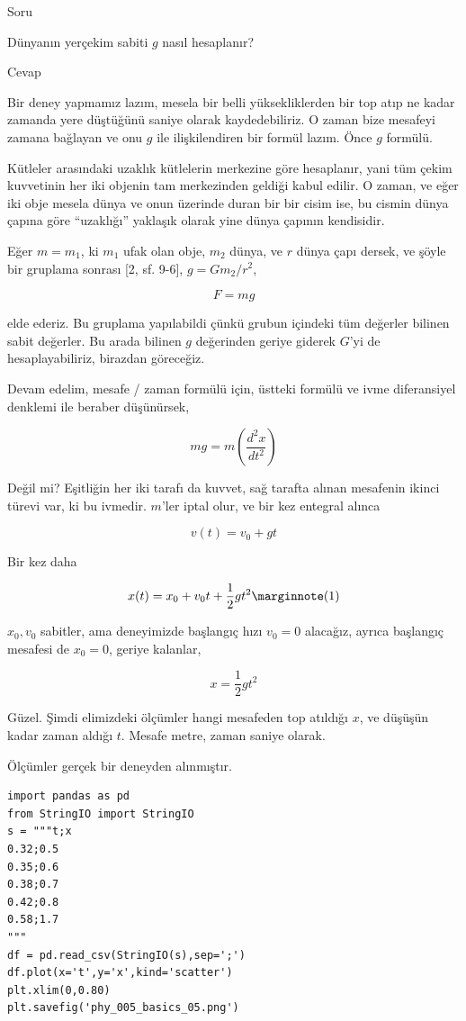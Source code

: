 \documentclass[12pt,fleqn]{article}\usepackage{../../common}
\begin{document}
Soru

Dünyanın yerçekim sabiti $g$ nasıl hesaplanır? 

Cevap

Bir deney yapmamız lazım, mesela bir belli yüksekliklerden bir top atıp ne
kadar zamanda yere düştüğünü saniye olarak kaydedebiliriz. O zaman bize
mesafeyi zamana bağlayan ve onu $g$ ile ilişkilendiren bir formül
lazım. Önce $g$ formülü.

Kütleler arasındaki uzaklık kütlelerin merkezine göre hesaplanır, yani tüm
çekim kuvvetinin her iki objenin tam merkezinden geldiği kabul edilir. O
zaman, ve eğer iki obje mesela dünya ve onun üzerinde duran bir bir cisim
ise, bu cismin dünya çapına göre ``uzaklığı'' yaklaşık olarak yine dünya
çapının kendisidir.

Eğer $m = m_1$, ki $m_1$ ufak olan obje, $m_2$ dünya, ve $r$ dünya çapı
dersek, ve şöyle bir gruplama sonrası [2, sf. 9-6], $g = Gm_2 / r^2$,

$$ F = m g$$

elde ederiz. Bu gruplama yapılabildi çünkü grubun içindeki tüm değerler bilinen
sabit değerler. Bu arada bilinen $g$ değerinden geriye giderek $G$'yi de
hesaplayabiliriz, birazdan göreceğiz.

Devam edelim, mesafe / zaman formülü için, üstteki formülü ve ivme diferansiyel
denklemi ile beraber düşünürsek,

$$ mg = m(\frac{d^2x}{dt^2})$$

Değil mi? Eşitliğin her iki tarafı da kuvvet, sağ tarafta alınan mesafenin
ikinci türevi var, ki bu ivmedir. $m$'ler iptal olur, ve bir kez entegral
alınca 

$$ v(t) = v_0 + gt$$

Bir kez daha

$$ 
x(t) = x_0 + v_0t + \frac{1}{2}gt^2
\mlabel{1}
$$

$x_0,v_0$ sabitler, ama deneyimizde başlangıç hızı $v_0=0$ alacağız, ayrıca
başlangıç mesafesi de $x_0=0$, geriye kalanlar,

$$ x = \frac{1}{2}gt^2$$

Güzel. Şimdi elimizdeki ölçümler hangi mesafeden top atıldığı $x$, ve
düşüşün kadar zaman aldığı $t$. Mesafe metre, zaman saniye olarak.

Ölçümler gerçek bir deneyden alınmıştır.

\begin{verbatim}
import pandas as pd
from StringIO import StringIO
s = """t;x
0.32;0.5
0.35;0.6
0.38;0.7
0.42;0.8
0.58;1.7
"""
df = pd.read_csv(StringIO(s),sep=';')
df.plot(x='t',y='x',kind='scatter')
plt.xlim(0,0.80)
plt.savefig('phy_005_basics_05.png')
\end{verbatim}
\end{document}
